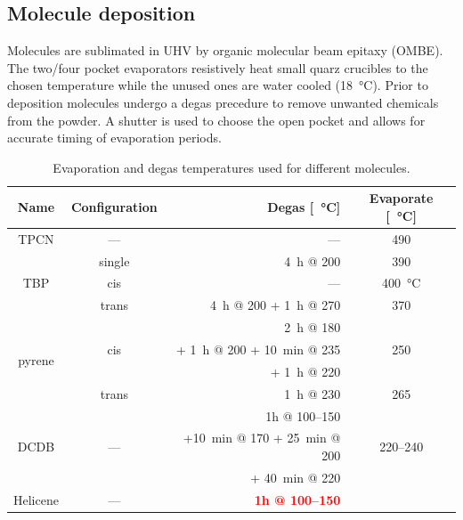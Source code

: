\subsection{Molecule deposition}
\label{sec:molecule-deposition}
Molecules are sublimated in UHV by organic molecular beam epitaxy (OMBE). The two/four pocket evaporators resistively heat small quarz crucibles to the chosen temperature while the unused ones are water cooled (\SI{18}{\celsius}). Prior to deposition molecules undergo a degas precedure to remove unwanted chemicals from the powder. A shutter is used to choose the open pocket and allows for accurate timing of evaporation periods.

\begin{table}\centering
	\caption{Evaporation and degas temperatures used for different molecules.}
	\begin{tabular}{ccrc}
		Name			& Configuration & Degas [\SI{}{\celsius}]	& Evaporate [\SI{}{\celsius}]	\\ \hline \hline 
		TPCN			& ---		& ---		& 490		\\ \hline 
		\multirow{3}{*}{TBP}	&single		& \SI{4}{\hour} @ \SI{200}{}& 390	\\
		&cis		& ---		& \SI{400}{\celsius}\\
		&trans		& \SI{4}{\hour} @ \SI{200}{} + \SI{1}{\hour} @ \SI{270}{}&\SI{370}{}\\ \hline 
		\multirow{4}{*}{pyrene} & \multirow{3}{*}{cis}		& \SI{2}{\hour} @ \SI{180}{}&	\multirow{3}{*}{250}	\\
		&&+ \SI{1}{\hour} @ \SI{200}{} + \SI{10}{\minute} @ \SI{235}{} 	&\\
		&&+ \SI{1}{\hour} @ \SI{220}{}&\\ 
		&trans		& \SI{1}{\hour} @ \SI{230}{}		&\SI{265}{}		\\ \hline
		\multirow{3}{*}{DCDB} & \multirow{3}{*}{---} & 1h @ \SIrange{100}{150}{}& \multirow{3}{*}{\SIrange{220}{240}{}}\\
		&&+\SI{10}{\minute} @ \SI{170}{} + \SI{25}{\minute} @ \SI{200}{} & \\
		&&+ \SI{40}{\minute} @ \SI{220}{}&\\
		\hline
		Helicene & --- & \textcolor{red}{\textbf{1h @ \SIrange{100}{150}{}}} & \\
	\end{tabular}
	\label{tab:molecule-temperatures}
\end{table}